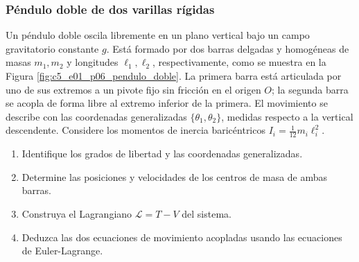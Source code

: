 \subsubsection{Péndulo doble de dos varillas rígidas}

Un péndulo doble oscila libremente en un plano vertical bajo un campo gravitatorio
constante $g$. Está formado por dos barras delgadas y homogéneas de masas $m_1,m_2$ y
longitudes $\ell_1,\ell_2$, respectivamente, como se muestra en la Figura
\ref{fig:c5_e01_p06_pendulo_doble}. La primera barra está articulada por uno de sus
extremos a un pivote fijo sin fricción en el origen $O$; la segunda barra se acopla de
forma libre al extremo inferior de la primera. El movimiento se describe con las
coordenadas generalizadas $\{\theta_1,\theta_2\}$, medidas respecto a la vertical
descendente. Considere los momentos de inercia baricéntricos $I_i=\tfrac{1}{12}m_i\ell_i^2$.

\begin{enumerate}
    \item Identifique los grados de libertad y las coordenadas generalizadas.
    \item Determine las posiciones y velocidades de los centros de masa de ambas barras.
    \item Construya el Lagrangiano $\mathcal{L}=T-V$ del sistema.
    \item Deduzca las dos ecuaciones de movimiento acopladas usando las ecuaciones de
          Euler-Lagrange.
\end{enumerate}

